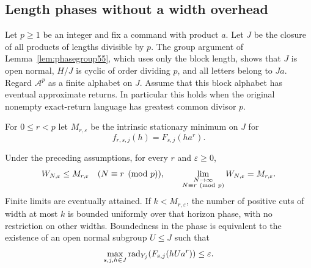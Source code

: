 \subsection{Length phases without a width overhead}
Let $p\ge1$ be an integer and fix a command with product $a$. Let $J$ be the closure of all products of lengths divisible by $p$. The group argument of Lemma~\ref{lem:phasegroup55}, which uses only the block length, shows that $J$ is open normal, $H/J$ is cyclic of order dividing $p$, and all letters belong to $Ja$. Regard $\mathcal A^p$ as a finite alphabet on $J$. Assume that this block alphabet has eventual approximate returns. In particular this holds when the original nonempty exact-return language has greatest common divisor $p$.

For $0\le r<p$ let $M_{r,\varepsilon}$ be the intrinsic stationary minimum on $J$ for
\[
                         f_{r,s,j}(h)=F_{s,j}(ha^r).
\]
\begin{theorem}\label{thm:phaseminimum56}
Under the preceding assumptions, for every $r$ and $\varepsilon\ge0$,
\begin{equation}\label{eq:phaseminimum56}
 W_{N,\varepsilon}\le M_{r,\varepsilon}\quad(N\equiv r\pmod p),
 \qquad
 \lim_{\substack{N\to\infty\\N\equiv r\ ({\rm mod}\ p)}}W_{N,\varepsilon}
          =M_{r,\varepsilon}.
\end{equation}
Finite limits are eventually attained. If $k<M_{r,\varepsilon}$, the number of positive cuts of width at most $k$ is bounded uniformly over that horizon phase, with no restriction on other widths. Boundedness in the phase is equivalent to the existence of an open normal subgroup $U\le J$ such that
\begin{equation}\label{eq:phasequotient56}
          \max_{s,j,h\in J}\operatorname{rad}_{Y_j}(F_{s,j}(hUa^r))\le\varepsilon.
\end{equation}
\end{theorem}
